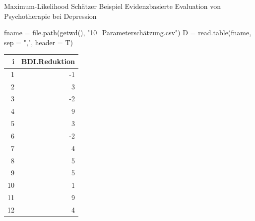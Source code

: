 \documentclass[
  8pt,
  ignorenonframetext,
]{beamer}
\newenvironment{Shaded}{\begin{snugshade}}{\end{snugshade}}
\newcommand{\AttributeTok}[1]{\textcolor[rgb]{0.77,0.63,0.00}{#1}}
\newcommand{\FunctionTok}[1]{\textcolor[rgb]{0.00,0.00,0.00}{#1}}
\newcommand{\NormalTok}[1]{#1}
\newcommand{\OtherTok}[1]{\textcolor[rgb]{0.56,0.35,0.01}{#1}}
\newcommand{\StringTok}[1]{\textcolor[rgb]{0.31,0.60,0.02}{#1}}
\begin{document}
\begin{frame}[fragile,t]{Maximum-Likelihood Schätzer}
\protect\hypertarget{maximum-likelihood-schuxe4tzer-12}{}
Beispiel \textbar{} Evidenzbasierte Evaluation von Psychotherapie bei
Depression

\small
\vspace{2mm}

\footnotesize

\begin{Shaded}
\begin{Highlighting}[]
\NormalTok{fname }\OtherTok{=} \FunctionTok{file.path}\NormalTok{(}\FunctionTok{getwd}\NormalTok{(), }\StringTok{"10\_Parameterschätzung.csv"}\NormalTok{)}
\NormalTok{D     }\OtherTok{=} \FunctionTok{read.table}\NormalTok{(fname, }\AttributeTok{sep =} \StringTok{","}\NormalTok{, }\AttributeTok{header =}\NormalTok{ T)}
\end{Highlighting}
\end{Shaded}

\vspace{2mm}

\begin{longtable}[]{@{}rr@{}}
\toprule()
i & BDI.Reduktion \\
\midrule()
\endhead
1 & -1 \\
2 & 3 \\
3 & -2 \\
4 & 9 \\
5 & 3 \\
6 & -2 \\
7 & 4 \\
8 & 5 \\
9 & 5 \\
10 & 1 \\
11 & 9 \\
12 & 4 \\
\bottomrule()
\end{longtable}
\end{frame}
\end{document}
